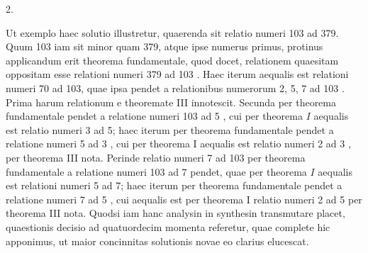 \documentclass[10pt]{article}
\begin{document}
2.

Ut exemplo haec solutio illustretur, quaerenda sit relatio numeri 103 ad 379. Quum 103 iam sit minor quam 379, atque ipse numerus primus, protinus applicandum erit theorema fundamentale, quod docet, relationem quaesitam oppositam esse relationi numeri 379 ad 103 . Haec iterum aequalis est relationi numeri 70 ad 103, quae ipsa pendet a relationibus numerorum 2, 5, 7 ad 103 . Prima harum relationum e theoremate III innotescit. Secunda per theorema fundamentale pendet a relatione numeri 103 ad 5 , cui per theorema \(I\) aequalis est relatio numeri 3 ad 5; haec iterum per theorema fundamentale pendet a relatione numeri 5 ad 3 , cui per theorema I aequalis est relatio numeri 2 ad 3 , per theorema III nota. Perinde relatio numeri 7 ad 103 per theorema fundamentale a relatione numeri 103 ad 7 pendet, quae per theorema \(I\) aequalis est relationi numeri 5 ad 7; haec iterum per theorema fundamentale pendet a relatione numeri 7 ad 5 , cui aequalis est per theorema I relatio numeri 2 ad 5 per theorema III nota. Quodsi iam hanc analysin in synthesin transmutare placet, quaestionis decisio ad quatuordecim momenta referetur, quae complete hic apponimus, ut maior concinnitas solutionis novae eo clarius elucescat.
\end{document}
